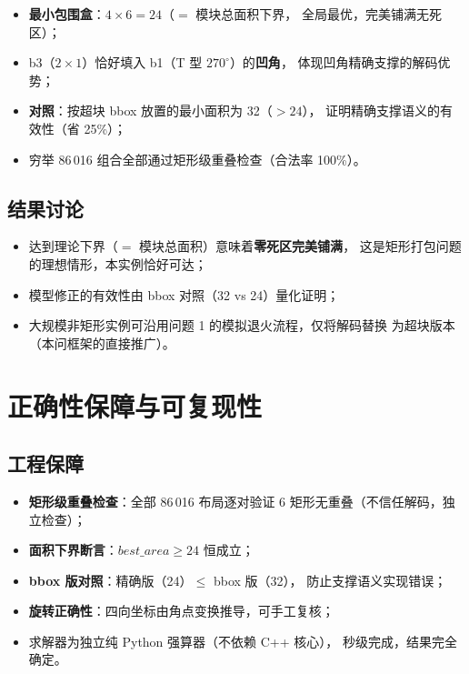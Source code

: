 \documentclass[12pt,a4paper]{article}
\begin{document}
\begin{itemize}
    \item \textbf{最小包围盒}：$4\times6 = 24$（$=$ 模块总面积下界，
    全局最优，完美铺满无死区）；
    \item b3（$2\times1$）恰好填入 b1（T 型 $270^\circ$）的\textbf{凹角}，
    体现凹角精确支撑的解码优势；
    \item \textbf{对照}：按超块 bbox 放置的最小面积为 32（$>24$），
    证明精确支撑语义的有效性（省 25\%）；
    \item 穷举 86\,016 组合全部通过矩形级重叠检查（合法率 100\%）。
\end{itemize}

\subsection{结果讨论}

\begin{itemize}
    \item 达到理论下界（$= $ 模块总面积）意味着\textbf{零死区完美铺满}，
    这是矩形打包问题的理想情形，本实例恰好可达；
    \item 模型修正的有效性由 bbox 对照（32 vs 24）量化证明；
    \item 大规模非矩形实例可沿用问题 1 的模拟退火流程，仅将解码替换
    为超块版本（本问框架的直接推广）。
\end{itemize}

\section{正确性保障与可复现性}

\subsection{工程保障}

\begin{itemize}
    \item \textbf{矩形级重叠检查}：全部 86\,016 布局逐对验证
    6 矩形无重叠（不信任解码，独立检查）；
    \item \textbf{面积下界断言}：$best\_area \ge 24$ 恒成立；
    \item \textbf{bbox 版对照}：精确版（24）$\le$ bbox 版（32），
    防止支撑语义实现错误；
    \item \textbf{旋转正确性}：四向坐标由角点变换推导，可手工复核；
    \item 求解器为独立纯 Python 强算器（不依赖 C++ 核心），
    秒级完成，结果完全确定。
\end{itemize}
\end{document}
